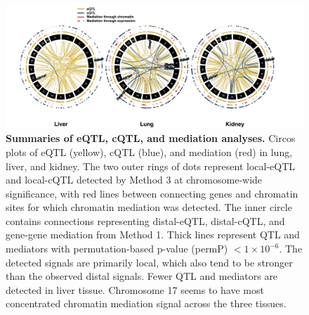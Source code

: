 \begin{figure}[hp]
\renewcommand{\familydefault}{\sfdefault}\normalfont
\centering
\includegraphics[width=\textwidth, trim={0.5in 0in 0.5in 0in}, clip]{figs/circos_over_tissues.pdf}
\caption{\textbf{Summaries of eQTL, cQTL, and mediation analyses.} Circos plots of eQTL (yellow), cQTL (blue), and mediation (red) in lung, liver, and kidney. The two outer rings of dots represent local-eQTL and local-cQTL detected by Method 3 at chromosome-wide significance, with red lines between connecting genes and chromatin sites for which chromatin mediation was detected. The inner circle contains connections representing distal-eQTL, distal-cQTL, and gene-gene mediation from Method 1. Thick lines represent QTL and mediators with permutation-based p-value (permP) $< 1 \times 10^{-6}$. The detected signals are primarily local, which also tend to be stronger than the observed distal signals. Fewer QTL and mediators are detected in liver tissue. Chromosome 17 seems to have most concentrated chromatin mediation signal across the three tissues.
\label{fig:circos_plot}}
\end{figure}

